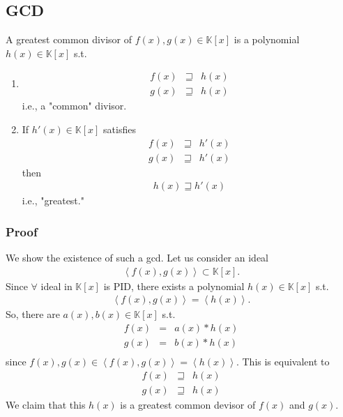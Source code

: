 \documentclass[11pt]{book}
\begin{document}

\subsection{GCD}
A greatest common divisor of $f(x),g(x) \in \mathbb{K}[x]$ is a polynomial $h(x) \in \mathbb{K}[x]$ s.t.
\begin{enumerate}
\item 
\begin{eqnarray}
f(x) &\sqsupseteq& h(x) \\
g(x) &\sqsupseteq& h(x) 
\end{eqnarray}
i.e., a "common" divisor.

\item If $h'(x) \in \mathbb{K}[x]$ satisfies
\begin{eqnarray}
f(x) &\sqsupseteq& h'(x) \\
g(x) &\sqsupseteq& h'(x) 
\end{eqnarray}
then
\begin{eqnarray}
h(x) \sqsupseteq h'(x) 
\end{eqnarray}
i.e., "greatest."

\end{enumerate}

\subsubsection{Proof}
We show the existence of such a gcd.
Let us consider an ideal
\begin{eqnarray}
\left< f(x), g(x) \right> \subset \mathbb{K}[x].
\end{eqnarray}
Since $\forall$ ideal in $\mathbb{K}[x]$ is PID, there exists a polynomial $h(x) \in \mathbb{K}[x]$ s.t.
\begin{eqnarray}
\left< f(x), g(x) \right> = \left< h(x)\right>.
\end{eqnarray}
So, there are $a(x),b(x) \in \mathbb{K}[x]$ s.t.
\begin{eqnarray}
f(x) &=& a(x) * h(x) \\
g(x) &=& b(x) * h(x) \\
\end{eqnarray}
since $f(x), g(x) \in \left< f(x), g(x) \right> = \left< h(x)\right>$.
This is equivalent to
\begin{eqnarray}
f(x) &\sqsupseteq& h(x) \\
g(x) &\sqsupseteq& h(x) 
\end{eqnarray}
We claim that this $h(x)$ is a greatest common devisor of $f(x)$ and $g(x)$.
\end{document}
